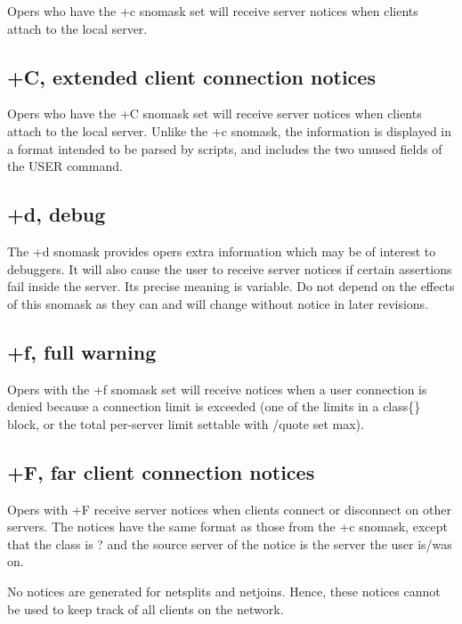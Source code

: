 	Opers who have the +c snomask set will receive server notices when
	clients attach to the local server.


\subsection{+C, extended client connection notices}

	Opers who have the +C snomask set will receive server notices when
	clients attach to the local server. Unlike the +c snomask, the
	information is displayed in a format intended to be parsed by scripts,
	and includes the two unused fields of the USER command.


\subsection{+d, debug}

	The +d snomask provides opers extra information which may be of
	interest to debuggers. It will also cause the user to receive server
	notices if certain assertions fail inside the server. Its precise
	meaning is variable. Do not depend on the effects of this snomask as
	they can and will change without notice in later revisions.


\subsection{+f, full warning}

	Opers with the +f snomask set will receive notices when a user
	connection is denied because a connection limit is exceeded (one of the
	limits in a class\{\} block, or the total per-{}server limit settable
	with /quote set max).


\subsection{+F, far client connection notices}

	Opers with +F receive server notices when clients connect or disconnect
	on other servers. The notices have the same format as those from the +c
	snomask, except that the class is ? and the source server of the notice
	is the server the user is/was on.

	No notices are generated for netsplits and netjoins. Hence, these
	notices cannot be used to keep track of all clients on the
	network.

